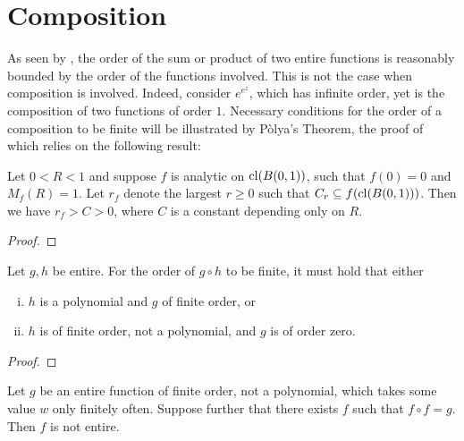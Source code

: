 \chapter{Composition}
\label{ch:composition}

As seen by , the order of the sum or product of two entire functions is reasonably bounded by the order of the functions involved. This is not the case when composition is involved. Indeed, consider $e^{e^z}$, which has infinite order, yet is the composition of two functions of order $1$. Necessary conditions for the order of a composition to be finite will be illustrated by Pòlya's Theorem, the proof of which relies on the following result:

\begin{lemma}[Bohr]
    Let $0 < R < 1$ and suppose $f$ is analytic on $\operatorname{cl}(B(0,1))$, such that $f(0) = 0$ and $M_f(R) = 1$. Let $r_f$ denote the largest $r \geq 0$ such that $C_r \subseteq f(\operatorname{cl}(B(0,1)))$. Then we have $r_f > C > 0$, where $C$ is a constant depending only on $R$.
\end{lemma}

\begin{proof}
\end{proof}

\begin{theorem}[Pólya] \label{thm:polya}
    Let $g, h$ be entire. For the order of $g \circ h$ to be finite, it must hold that either
    \begin{enumerate}[i.]
        \item $h$ is a polynomial and $g$ of finite order, or
        \item $h$ is of finite order, not a polynomial, and $g$ is of order zero.
    \end{enumerate}
\end{theorem}

\begin{proof}
\end{proof}

\begin{theorem}[Thron] \label{thm:thron}
    Let $g$ be an entire function of finite order, not a polynomial, which takes some value $w$ only finitely often. Suppose further that there exists $f$ such that $f \circ f = g$. Then $f$ is not entire.
\end{theorem}

